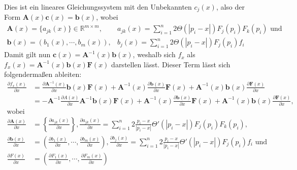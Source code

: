 Dies ist ein lineares Gleichungssystem mit den Unbekannten $c_j(x)$, also der Form $\bm{A}(x)\bm{c}(x) = \bm{b}(x)$, wobei
\begin{align*}
  \bm{A}(x) = \{a_{jk}(x)\} \in \mathbb{R}^{m\times m}, & a_{jk}(x) = \sum_{i=1}^n2\Theta(|p_i - x|)F_j(p_i)F_k(p_i)\text{ und}\\
  \bm{b}(x) = (b_1(x),\cdots,b_m(x)), & b_j(x) = \sum_{i=1}^n2\Theta(|p_i - x|)F_j(p_i)f_i
\end{align*}
Damit gilt nun $\bm{c}(x) = \bm{A}^{-1}(x)\bm{b}(x)$, weshalb sich $f_x$ als $f_x(x) = \bm{A}^{-1}(x)\bm{b}(x)\bm{F}(x)$ darstellen lässt. Dieser Term lässt sich folgendermaßen ableiten:
\begin{align*}
  \frac{\partial f_x(x)}{\partial x} &= \frac{\partial \bm{A}^{-1}(x)}{\partial x}\bm{b}(x)\bm{F}(x) + \bm{A}^{-1}(x)\frac{\partial \bm{b}(x)}{\partial x}\bm{F}(x) + \bm{A}^{-1}(x)\bm{b}(x)\frac{\partial \bm{F}(x)}{\partial x}\\
                                     &= -\bm{A}^{-1}\frac{\partial A(x)}{\partial x}\bm{A}^{-1}\bm{b}(x)\bm{F}(x) + \bm{A}^{-1}(x)\frac{\partial \bm{b}(x)}{\partial x}\bm{F}(x) + \bm{A}^{-1}(x)\bm{b}(x)\frac{\partial \bm{F}(x)}{\partial x}\text{, }\\\text{wobei}\\
  \frac{\partial \bm{A}(x)}{\partial x} &= \left\{\frac{\partial a_{jk}(x)}{\partial x}\right\}, \frac{\partial a_{jk}(x)}{\partial x} = \sum_{i = 1}^n2\frac{p_i - x}{|p_i - x|}\Theta'(|p_i - x|)F_j(p_i)F_k(p_i)\text{,}\\
  \frac{\partial\bm{b}(x)}{\partial x} &= \left(\frac{\partial b_1(x)}{\partial x}, \cdots, \frac{\partial b_m(x)}{\partial x}\right), \frac{\partial b_j(x)}{\partial x} = \sum_{i = 1}^n2\frac{p_i - x}{|p_i - x|}\Theta'(|p_i - x|)F_j(p_i)f_i\text{ und}\\
  \frac{\partial F(x)}{\partial x} &= \left(\frac{\partial F_1(x)}{\partial x},\cdots,\frac{\partial F_m(x)}{\partial x}\right)
\end{align*}